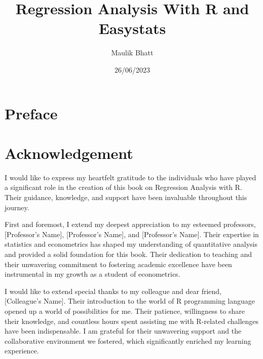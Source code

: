 \documentclass[
  letterpaper,
  twoside,
  openright,
  headsepline,
  footsepline,
  listof = totocnumbered,
  chapterprefix = true,
  titlepage = false]{scrbook}
\title{Regression Analysis With R and Easystats}
\author{Maulik Bhatt}
\date{26/06/2023}
\renewcommand*\contentsname{Table of contents}
\newcommand\contentsname{Table of contents}
\begin{document}
\frontmatter
\maketitle
\ifdefined\Shaded\renewenvironment{Shaded}{\begin{tcolorbox}[interior hidden, borderline west={3pt}{0pt}{shadecolor}, enhanced, breakable, boxrule=0pt, frame hidden, sharp corners]}{\end{tcolorbox}}\fi

\renewcommand*\contentsname{Contents}
{
\hypersetup{linkcolor=}
\setcounter{tocdepth}{2}
\tableofcontents
}
\listoffigures
\listoftables
\mainmatter
{}

\hypertarget{preface}{%
\chapter*{Preface}\label{preface}}



\hypertarget{acknowledgement}{%
\chapter*{Acknowledgement}\label{acknowledgement}}


I would like to express my heartfelt gratitude to the individuals who
have played a significant role in the creation of this book on
Regression Analysis with R. Their guidance, knowledge, and support have
been invaluable throughout this journey.

First and foremost, I extend my deepest appreciation to my esteemed
professors, {[}Professor's Name{]}, {[}Professor's Name{]}, and
{[}Professor's Name{]}. Their expertise in statistics and econometrics
has shaped my understanding of quantitative analysis and provided a
solid foundation for this book. Their dedication to teaching and their
unwavering commitment to fostering academic excellence have been
instrumental in my growth as a student of econometrics.

I would like to extend special thanks to my colleague and dear friend,
{[}Colleague's Name{]}. Their introduction to the world of R programming
language opened up a world of possibilities for me. Their patience,
willingness to share their knowledge, and countless hours spent
assisting me with R-related challenges have been indispensable. I am
grateful for their unwavering support and the collaborative environment
we fostered, which significantly enriched my learning experience.
\end{document}
